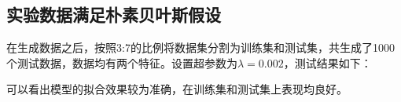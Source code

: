 \documentclass[12pt]{article}
\begin{document}
\subsection{实验数据满足朴素贝叶斯假设}
在生成数据之后，按照3:7的比例将数据集分割为训练集和测试集，共生成了1000个测试数据，数据均有两个特征。设置超参数为$\lambda=0.002$，测试结果如下：
\begin{figure}[H]
    \centering
\end{figure}
可以看出模型的拟合效果较为准确，在训练集和测试集上表现均良好。
\end{document}
